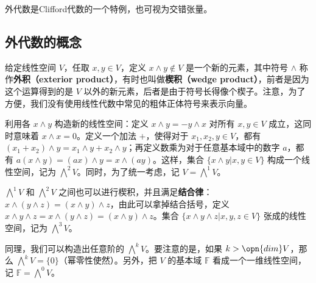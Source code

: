 
外代数是Clifford代数的一个特例，也可视为交错张量。

\subsection{外代数的概念}

给定线性空间 $V$，任取 $x, y\in V$，定义 $x\wedge y\not\in V$ 是一个新的元素，其中符号 $\wedge$ 称作\textbf{外积（exterior product）}，有时也叫做\textbf{楔积（wedge product）}，前者是因为这个运算得到的是 $V$ 以外的新元素，后者是由于符号长得像个楔子。注意，为了方便，我们没有使用线性代数中常见的粗体正体符号来表示向量。

利用各 $x\wedge y$ 构造新的线性空间：定义 $x\wedge y=-y\wedge x$ 对所有 $x, y\in V$ 成立，这同时意味着 $x\wedge x=0$。定义一个加法 $+$，使得对于 $x_1, x_2, y\in V$，都有 $(x_1+x_2)\wedge y=x_1\wedge y+x_2\wedge y$；再定义数乘为对于任意基本域中的数字 $a$，都有 $a(x\wedge y)=(ax)\wedge y=x\wedge(ay)$。这样，集合 $\{x\wedge y|x, y\in V\}$ 构成一个线性空间，记为 $\bigwedge^2 V$。同时，为了统一考虑，记 $V=\bigwedge^1 V$。

$\bigwedge^1 V$ 和 $\bigwedge^2 V$ 之间也可以进行楔积，并且满足\textbf{结合律}：$x\wedge(y\wedge z)=(x\wedge y)\wedge z$，由此可以拿掉结合括号，定义 $x\wedge y\wedge z=x\wedge(y\wedge z)=(x\wedge y)\wedge z$。集合 $\{x\wedge y\wedge z|x, y, z\in V\}$ 张成的线性空间，记为 $\bigwedge^3 V$。

同理，我们可以构造出任意阶的 $\bigwedge^k V$。要注意的是，如果 $k>\opn{dim} V$，那么 $\bigwedge^k V=\{0\}$（幂零性使然）。另外，把 $V$ 的基本域 $\mathbb{F}$ 看成一个一维线性空间，记 $\mathbb{F}=\bigwedge^0 V$。

